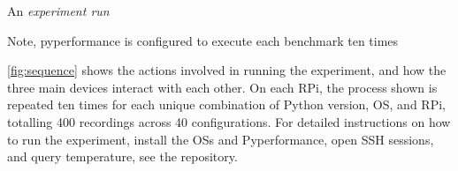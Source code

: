 

An \emph{experiment run}

Note, \gls{pyperformance} is configured to execute each benchmark ten times


\autoref{fig:sequence} shows the actions involved in running the experiment, and how the three main devices interact with each other.
On each RPi, the process shown is repeated ten times for each unique combination of Python version, OS, and RPi, totalling 400 recordings across 40 configurations.
For detailed instructions on how to run the experiment, install the OSs and Pyperformance, open SSH sessions, and query temperature, see the repository.

